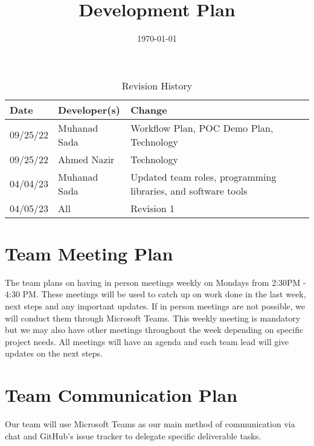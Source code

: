 \documentclass[12pt,titlepage]{article}
\date{}
\begin{document}
\title{\huge Development Plan\\\progname}

\author{\authname}
\date{\today}

\maketitle
\newpage

\begin{table}[hp]
\caption{Revision History} \label{TblRevisionHistory}
\begin{tabularx}{\textwidth}{llX}
\toprule
\textbf{Date} & \textbf{Developer(s)} & \textbf{Change}\\
\midrule
09/25/22 & Muhanad Sada & Workflow Plan, POC Demo Plan, Technology\\
09/25/22 & Ahmed Nazir & Technology\\
04/04/23 & Muhanad Sada & Updated team roles, programming libraries, and software tools \\
04/05/23 & All & Revision 1\\
\bottomrule
\end{tabularx}
\end{table}

\newpage
\tableofcontents
\listoftables

\newpage




\section{Team Meeting Plan}
The team plans on having in person meetings weekly on Mondays from 2:30PM - 4:30 PM. These meetings will be used to catch up on work done in the last week, next steps and any important updates. If in person meetings are not possible, we will conduct them through Microsoft Teams. This weekly meeting is mandatory but we may also have other meetings throughout the week depending on specific project needs. All meetings will have an agenda and each team lead will give updates on the next steps. 

\section{Team Communication Plan}
Our team will use Microsoft Teams as our main method of communication via chat and GitHub's issue tracker to delegate specific deliverable tasks.
\end{document}
